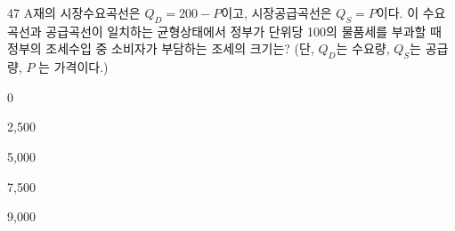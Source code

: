 \begin{question}{47}
A재의 시장수요곡선은 $Q_{ D } =200-P$이고, 시장공급곡선은 $Q_{ S } =P$이다. 이 수요곡선과 공급곡선이 일치하는 균형상태에서 정부가 단위당 100의 물품세를 부과할 때 정부의 조세수입 중 소비자가 부담하는 조세의 크기는? (단, $Q_{ D }$는 수요량, $Q_{ S }$는 공급량, $P$ 는 가격이다.)
\begin{choices}
  \item 0
  \item 2,500
  \item 5,000
  \item 7,500
  \item 9,000
\end{choices}
\end{question}
